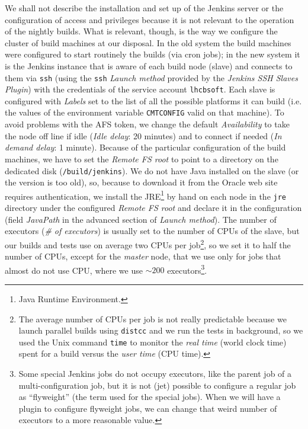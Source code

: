 \documentclass{lhcbnote}
\begin{document}
We shall not describe the installation and set up of the Jenkins server or the
configuration of access and privileges because it is not relevant to the
operation of the nightly builds.  What is relevant, though, is the way we
configure the cluster of build machines at our disposal.  In the old system the
build machines were configured to start routinely the builds (via cron jobs); in
the new system it is the Jenkins instance that is aware of each build node
(slave) and connects to them via \texttt{ssh} (using the \texttt{ssh}
\emph{Launch method} provided by the \emph{Jenkins SSH Slaves Plugin}) with the
credentials of the service account \texttt{lhcbsoft}.  Each slave is configured
with \emph{Labels} set to the list of all the possible platforms it can build
(i.e. the values of the environment variable \texttt{CMTCONFIG} valid on that
machine). To avoid problems with the AFS token, we change the default
\emph{Availability} to take the node off line if idle (\emph{Idle delay}: 20
minutes) and to connect if needed (\emph{In demand delay}: 1 minute).  Because
of the particular configuration of the build machines, we have to set the
\emph{Remote FS root} to point to a directory on the dedicated disk
(\texttt{/build/jenkins}).  We do not have Java installed on the slave (or the
version is too old), so, because to download it from the Oracle web site
requires authentication, we install the JRE\footnote{Java Runtime
Environment\cite{JRE}.} by hand on each node in the \texttt{jre} directory under
the configured \emph{Remote FS root} and declare it in the configuration (field
\emph{JavaPath} in the advanced section of \emph{Launch method}).  The number of
executors (\emph{\# of executors}) is usually set to the number of CPUs of the
slave, but our builds and tests use on average two CPUs per job\footnote{The
average number of CPUs per job is not
  really predictable because we launch parallel builds using
  \texttt{distcc}\cite{distcc,distccCERN} and we run the tests in background, so
  we used the Unix command \texttt{time} to monitor the \emph{real time} (world
  clock time) spent for a build versus the \emph{user time} (CPU time).},
so we set it to half the number of CPUs, except for the \emph{master} node, that
we use only for jobs that almost do not use CPU, where we use $\sim200$
executors\footnote{Some special Jenkins jobs do not occupy executors, like the
parent job of a multi-configuration job, but it is not (jet) possible to
configure a regular job as ``flyweight'' (the term used for the special jobs).
When we will have a plugin to configure flyweight jobs, we can change that weird
number of executors to a more reasonable value.}.
\end{document}
